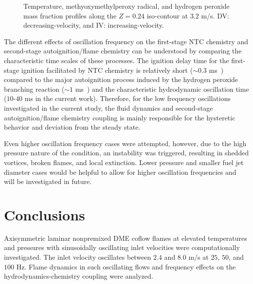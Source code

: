 \documentclass[review,3p,times]{elsarticle}
\begin{document}
\begin{figure}[t]
  \centering
  \scriptsize
  \resizebox{0.8\textwidth}{!}{}
  \resizebox{0.8\textwidth}{!}{}
  \resizebox{0.8\textwidth}{!}{}
  \normalsize
  \vspace{-0.2in}
  \caption{\textcolor{Rev1}{Temperature, methyoxymethylperoxy radical, and hydrogen peroxide mass fraction profiles along the $Z = 0.24$ iso-contour at $3.2$ m/s.  DV: decreasing-velocity, and IV: increasing-velocity.}}
  \label{fig:ind_frq}
\end{figure}

\textcolor{Rev1}{The different effects of oscillation frequency on the first-stage NTC chemistry and second-stage autoignition/flame chemistry can be understood by comparing the characteristic time scales of these processes.  The ignition delay time for the first-stage ignition facilitated by NTC chemistry is relatively short ($\sim 0.3$ ms~\cite{deng15b}) compared to the major autoignition process induced by the hydrogen peroxide branching reaction ($\sim 1$ ms~\cite{deng15b}) and the characteristic hydrodynamic oscillation time ($10$-$40$ ms in the current work).  Therefore, for the low frequency oscillations investigated in the current study, the fluid dynamics and second-stage autoignition/flame chemistry coupling is mainly responsible for the hysteretic behavior and deviation from the steady state.}

\textcolor{Rev1}{Even higher oscillation frequency cases were attempted, however, due to the high pressure nature of the condition, an instability was triggered, resulting in shedded vortices, broken flames, and local extinction.  Lower pressure and smaller fuel jet diameter cases would be helpful to allow for higher oscillation frequencies and will be investigated in future.}  



\section{Conclusions}

Axisymmetric laminar nonpremixed DME coflow flames at elevated temperatures and pressures with sinusoidally oscillating inlet velocities were computationally investigated.  The inlet velocity oscillates between $2.4$ and $8.0$ m/s at $25$, $50$, and $100$ Hz.  Flame dynamics in such oscillating flows and frequency effects on the hydrodynamics-chemistry coupling were analyzed.
\end{document}
